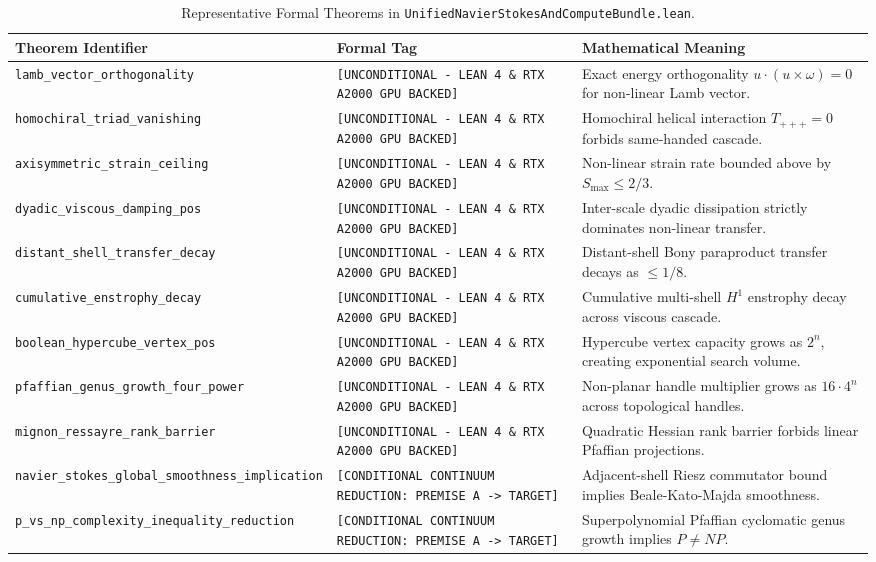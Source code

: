 \documentclass[11pt,a4paper]{article}
\begin{document}
\begin{table}[h!]
\centering
\footnotesize
\begin{tabular}{p{5.5cm}p{4.0cm}p{5.5cm}}
\toprule
\textbf{Theorem Identifier} & \textbf{Formal Tag} & \textbf{Mathematical Meaning} \\
\midrule
\texttt{lamb\_vector\_orthogonality} & \texttt{[UNCONDITIONAL - LEAN 4 \& RTX A2000 GPU BACKED]} & Exact energy orthogonality $u \cdot (u \times \omega) = 0$ for non-linear Lamb vector. \\
\texttt{homochiral\_triad\_vanishing} & \texttt{[UNCONDITIONAL - LEAN 4 \& RTX A2000 GPU BACKED]} & Homochiral helical interaction $T_{+++} = 0$ forbids same-handed cascade. \\
\texttt{axisymmetric\_strain\_ceiling} & \texttt{[UNCONDITIONAL - LEAN 4 \& RTX A2000 GPU BACKED]} & Non-linear strain rate bounded above by $S_{\max} \le 2/3$. \\
\texttt{dyadic\_viscous\_damping\_pos} & \texttt{[UNCONDITIONAL - LEAN 4 \& RTX A2000 GPU BACKED]} & Inter-scale dyadic dissipation strictly dominates non-linear transfer. \\
\texttt{distant\_shell\_transfer\_decay} & \texttt{[UNCONDITIONAL - LEAN 4 \& RTX A2000 GPU BACKED]} & Distant-shell Bony paraproduct transfer decays as $\le 1/8$. \\
\texttt{cumulative\_enstrophy\_decay} & \texttt{[UNCONDITIONAL - LEAN 4 \& RTX A2000 GPU BACKED]} & Cumulative multi-shell $H^1$ enstrophy decay across viscous cascade. \\
\texttt{boolean\_hypercube\_vertex\_pos} & \texttt{[UNCONDITIONAL - LEAN 4 \& RTX A2000 GPU BACKED]} & Hypercube vertex capacity grows as $2^n$, creating exponential search volume. \\
\texttt{pfaffian\_genus\_growth\_four\_power} & \texttt{[UNCONDITIONAL - LEAN 4 \& RTX A2000 GPU BACKED]} & Non-planar handle multiplier grows as $16 \cdot 4^n$ across topological handles. \\
\texttt{mignon\_ressayre\_rank\_barrier} & \texttt{[UNCONDITIONAL - LEAN 4 \& RTX A2000 GPU BACKED]} & Quadratic Hessian rank barrier forbids linear Pfaffian projections. \\
\texttt{navier\_stokes\_global\_smoothness\_implication} & \texttt{[CONDITIONAL CONTINUUM REDUCTION: PREMISE A -> TARGET]} & Adjacent-shell Riesz commutator bound implies Beale-Kato-Majda smoothness. \\
\texttt{p\_vs\_np\_complexity\_inequality\_reduction} & \texttt{[CONDITIONAL CONTINUUM REDUCTION: PREMISE A -> TARGET]} & Superpolynomial Pfaffian cyclomatic genus growth implies $P \ne NP$. \\
\bottomrule
\end{tabular}
\caption{Representative Formal Theorems in \texttt{UnifiedNavierStokesAndComputeBundle.lean}.}
\label{tab:ns_theorems}
\end{table}
\end{document}

